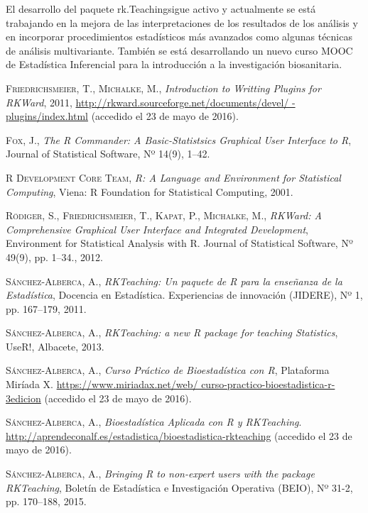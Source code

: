 \documentclass[a4paper,10pt,twoside]{article}
\newcommand{\rkteaching}{\textsf{rk.Teaching}}
\begin{document}
El desarrollo del paquete \rkteaching sigue activo y actualmente se está trabajando en la mejora de las interpretaciones
de los resultados de los análisis y en incorporar procedimientos estadísticos más avanzados como algunas técnicas de
análisis multivariante. 
También se está desarrollando un nuevo curso MOOC de Estadística Inferencial para la introducción a la investigación
biosanitaria. 

\begin{thebibliography}{9}

\textsc{Friedrichsmeier}, T., \textsc{Michalke}, M., \textit{Introduction to Writting Plugins
for RKWard}, 2011, \url{http://rkward.sourceforge.net/documents/devel/
-plugins/index.html} (accedido el 23 de mayo de 2016).

\textsc{Fox}, J., \textit{The R Commander: A Basic-Statistsics Graphical User Interface to R}, Journal
of Statistical Software, Nº 14(9), 1--42.

\textsc{R Development Core Team}, \textit{R: A Language and Environment for Statistical Computing}, Viena: R Foundation
for Statistical Computing, 2001. 

\textsc{Rödiger}, S., \textsc{Friedrichsmeier}, T., \textsc{Kapat}, P., \textsc{Michalke}, M., \textit{RKWard: A
Comprehensive Graphical User Interface and Integrated Development}, Environment for Statistical Analysis
with R. Journal of Statistical Software, Nº 49(9), pp. 1--34., 2012.

\textsc{Sánchez-Alberca}, A., \textit{RKTeaching: Un paquete de R para la enseñanza de la Estadística}, Docencia en
Estadística. Experiencias de innovación (JIDERE), Nº 1, pp. 167--179, 2011.

\textsc{Sánchez-Alberca}, A., \textit{RKTeaching: a new R package for teaching Statistics}, UseR!, Albacete, 2013. 

\textsc{Sánchez-Alberca}, A., \textit{Curso Práctico de Bioestadística con R}, Plataforma Miríada X.
\url{https://www.miriadax.net/web/ curso-practico-bioestadistica-r-3edicion} (accedido el 23 de mayo de 2016).

\textsc{Sánchez-Alberca}, A., \textit{Bioestadística Aplicada con R y RKTeaching}.
\url{http://aprendeconalf.es/estadistica/bioestadistica-rkteaching} (accedido el 23 de mayo de 2016).

\textsc{Sánchez-Alberca}, A., \textit{Bringing R to non-expert users with the package RKTeaching}, Boletín de
Estadística e Investigación Operativa (BEIO), Nº 31-2, pp. 170--188, 2015.

\end{thebibliography}
\end{document}
